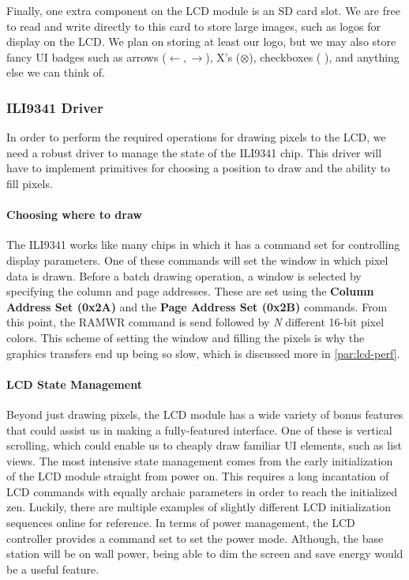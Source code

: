 Finally, one extra component on the LCD module is an SD card slot. We are free
to read and write directly to this card to store large images, such as logos
for display on the LCD. We plan on storing at least our logo, but we may also
store fancy UI badges such as arrows ($\leftarrow,\rightarrow$), X's
($\otimes$), checkboxes (
\makebox[0pt][l]{$\square$}\raisebox{.15ex}{\hspace{0.1em}$\checkmark$}), and
anything else we can think of.

\subsubsection{ILI9341 Driver}
\label{sec:lcd-driver}

In order to perform the required operations for drawing pixels to the LCD, we
need a robust driver to manage the state of the ILI9341 chip. This driver will
have to implement primitives for choosing a position to draw and the ability to fill
pixels.

\paragraph{Choosing where to draw}
The ILI9341 works like many chips in which it has a command set for controlling
display parameters. One of these commands will set the window in which pixel
data is drawn. Before a batch drawing operation, a window is selected by
specifying the column and page addresses. These are set using the
\textbf{Column Address Set (0x2A)} and the \textbf{Page Address Set (0x2B)}
commands. From this point, the RAMWR command is send followed by \emph{N}
different 16-bit pixel colors. This scheme of setting the window and filling
the pixels is why the graphics transfers end up being so slow, which is
discussed more in \autoref{par:lcd-perf}.

\paragraph{LCD State Management}
Beyond just drawing pixels, the LCD module has a wide variety of bonus features
that could assist us in making a fully-featured interface. One of these is
vertical scrolling, which could enable us to cheaply draw familiar UI elements,
such as list views. The most intensive state management comes from the early
initialization of the LCD module straight from power on. This requires a long
incantation of LCD commands with equally archaic parameters in order to reach
the initialized zen. Luckily, there are multiple examples of slightly different
LCD initialization sequences online for reference. In terms of power
management, the LCD controller provides a command set to set the power mode.
Although, the base station will be on wall power, being able to dim the screen
and save energy would be a useful feature.

